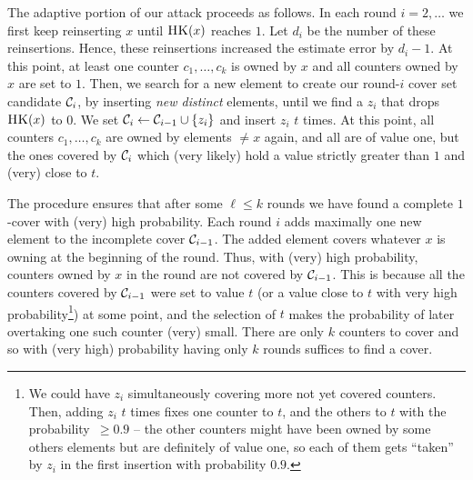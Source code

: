 The adaptive portion of our attack proceeds as follows. In each round $i = 2, \dots$ we
first keep reinserting $x$ until $\textnormal{\textsc{HK}}(x)$ reaches $1$. 
Let $d_i$ be the number of these reinsertions.  Hence, these reinsertions increased the estimate error by $d_i - 1$. At this point, at least one counter $c_1, \dots, c_k$ is owned by $x$ and all counters owned by $x$ are  set to $1$. Then, 
we search for a new element to create our round-$i$ cover set candidate $\mathcal{C}_i$, by inserting \textit{new distinct} elements, until we find a $z_i$ that drops $\textnormal{\textsc{HK}}(x)$ to $0$.
We set $\mathcal{C}_i \gets \mathcal{C}_{i-1} \cup \{z_i\}$ and insert $z_i$ $t$ times. At this point, all counters $c_1, \dots, c_k$ are owned by elements $\neq x$ again, and all are of value one, but the ones covered by $\mathcal{C}_i$ which (very 
likely)  hold a value strictly greater than $1$ and (very) close to $t$. 

The procedure ensures that after some $\ell \leq k$ rounds we have found a complete $1$-cover with (very) high probability.
Each round $i$ adds maximally one new element to the incomplete cover $\mathcal{C}_{i-1}$. The added element covers whatever $x$ is owning at the beginning of the round. Thus, with (very) high probability, counters owned by $x$ in the round are not covered by $\mathcal{C}_{i-1}$. This is because all the counters covered by $\mathcal{C}_{i-1}$ were set to value $t$ (or a value close to $t$ with very high probability\footnote{We could have $z_i$ simultaneously covering more not yet covered counters. Then, adding $z_i$ $t$ times fixes one counter to $t$, and the others to $t$ with the probability~$ \geq 0.9$ -- the other counters might have been owned by some others elements but are definitely of value one, so each of them gets ``taken'' by $z_i$ in the first insertion with probability $0.9$.}) at some point, and the selection of $t$ makes the probability of later overtaking one such counter (very) small. There are only $k$ counters to cover and so with (very high) probability having only $k$ rounds suffices to find a cover.

